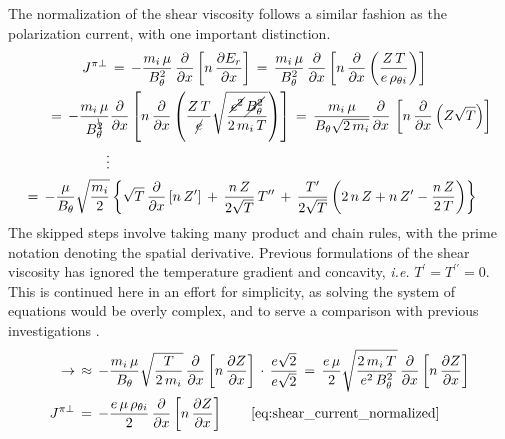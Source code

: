 The normalization of the shear viscosity follows a similar fashion as the polarization current, with one important distinction.
\begin{align} %
	J^{\pi\perp} \,&=\, -\frac{m_i \, \mu}{B_\theta^2} \,
		\frac{\partial}{\partial x} \left[n \, \frac{\partial E_r}
		{\partial x}\right]
		\,=\, \frac{m_i \, \mu}{B_\theta^2} \, \frac{\partial}{\partial x}
		\left[n \, \frac{\partial}{\partial x} \left(\frac{Z \, T}
		{e \, \rho_{\theta i}}\right)\right] \\
	=\, -\frac{m_i \, \mu}{B_\theta^{\bcancel{2}}} &\frac{\partial}{\partial x}
		\left[n \, \frac{\partial}{\partial x}\left(\frac{Z \, T}{\cancel{e}}
		\sqrt{\frac{\cancel{e^2} \, \cancel{B_\theta^{2}}}{2 \, m_i \, T}}
		\right)\right]
		\,=\, \frac{m_i \, \mu}{B_\theta \sqrt{2 \, m_i}}
		\frac{\partial}{\partial x} \, \left[n \, \frac{\partial}{\partial x}
		\left(Z \sqrt{T}\right)\right] \\
	\nonumber\vdots \\
	=\, -\frac{\mu}{B_\theta} \sqrt{\frac{m_i}{2}} &\left\{\sqrt{T} \,
		\frac{\partial}{\partial x} \left[n \, Z^\prime\right] \,+\,
		\frac{n \, Z}{2\sqrt{T}} \, T^{\prime\prime} \,+\,
		\frac{T^\prime}{2\sqrt{T}} \left(2 \, n \, Z + n \, Z^\prime -
		\frac{n \, Z}{2 \, T}\right)\right\}
\end{align}
The skipped steps involve taking many product and chain rules, with the prime notation denoting the spatial derivative.
Previous formulations of the shear viscosity has ignored the temperature gradient and concavity, \emph{i.e.} $T^\prime = T^{\prime\prime} = 0$.
This is continued here in an effort for simplicity, as solving the system of equations would be overly complex, and to serve a comparison with previous investigations \cite{staps_backstepping_2017}.
\begin{align} %
	\rightarrow\, &\approx\, -\frac{m_i \, \mu}{B_\theta}
		\sqrt{\frac{T}{2 \, m_i}} \, \frac{\partial}{\partial x} \left[n \,
		\frac{\partial Z}{\partial x} \right] \,\cdot\,
		\frac{e\sqrt{2}}{e\sqrt{2}}
		\,=\, \frac{e \, \mu}{2} \sqrt{\frac{2 \, m_i \, T}{e^2 \, B_\theta^2}}
		\, \frac{\partial}{\partial x} \left[n \, \frac{\partial Z}{\partial x}
		\right] \\
	J^{\pi\perp} \,&=\, -\frac{e \, \mu \, \rho_{\theta i}}{2} \,
		\frac{\partial}{\partial x} \left[n \, \frac{\partial Z}
		{\partial x}\right] \tag*{\eqref{eq:shear_current_normalized}}
\end{align}

